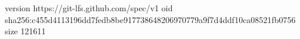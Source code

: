 version https://git-lfs.github.com/spec/v1
oid sha256:c455d4113196dd7fedb8be917738648206970779a9f7d4ddf10ca08521fb0756
size 121611
